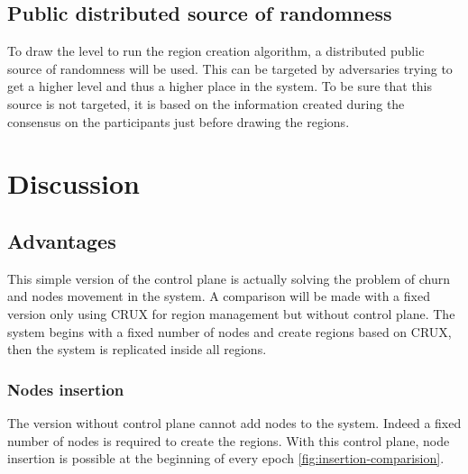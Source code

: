 \documentclass[a4paper,11pt,oneside]{report}
\begin{document}
\subsection{Public distributed source of randomness}
To draw the level to run the region creation algorithm, a distributed public
source of randomness will be used. This can be targeted by adversaries trying to
get a higher level and thus a higher place in the system. To be sure that this
source is not targeted, it is  based on the information created during the
consensus on the participants just before drawing the regions. 

\FloatBarrier
\section{Discussion}
\subsection{Advantages}
This simple version of the control plane is actually solving the problem of
churn and nodes movement in the system. A comparison will be made with a fixed
version only using CRUX for region management but without control plane. The
system begins with a fixed number of nodes and create regions based on CRUX,
then the system is replicated inside all regions. 

\subsubsection{Nodes insertion}
The version without control plane cannot add nodes to the system. Indeed a
fixed number of nodes is required to create the regions. With this control
plane, node insertion is possible at the beginning of every epoch
\autoref{fig:insertion-comparision}.
\end{document}
